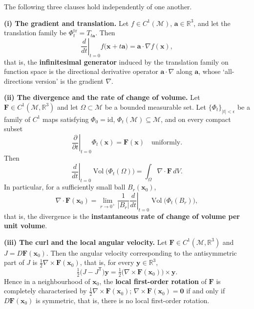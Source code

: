 \begin{theorem}\label{thm:infinitesimal_generators}
The following three clauses hold independently of one another.

\textbf{(i) The gradient and translation.} Let $f \in C^1(\mathcal{M})$, $\mathbf{a} \in \mathbb{R}^3$, and let the translation family be $\Phi_t^{\mathrm{tr}} = T_{t\mathbf a}$. Then
\[
\left.\frac{d}{dt}\right|_{t=0} f\bigl(\mathbf{x} + t\mathbf{a}\bigr) = \mathbf{a}\cdot\nabla f(\mathbf{x}),
\]
that is, the \textbf{infinitesimal generator} induced by the translation family on function space is the directional derivative operator $\mathbf a\cdot\nabla$ along $\mathbf a$, whose `all-directions version' is the gradient $\nabla$.

\textbf{(ii) The divergence and the rate of change of volume.} Let $\mathbf{F} \in C^1(\mathcal{M}, \mathbb{R}^3)$ and let $\Omega \subset \mathcal{M}$ be a bounded measurable set. Let $\{\Phi_t\}_{|t|<\epsilon}$ be a family of $C^1$ maps satisfying $\Phi_0 = \mathrm{id}$, $\Phi_t(\mathcal M)\subseteq\mathcal M$, and on every compact subset
\[
\left.\frac{\partial}{\partial t}\right|_{t=0}\Phi_t(\mathbf{x}) = \mathbf{F}(\mathbf{x}) \quad\text{uniformly}.
\]
Then
\[
\left.\frac{d}{dt}\right|_{t=0}\operatorname{Vol}\bigl(\Phi_t(\Omega)\bigr) = \int_{\Omega} \nabla \cdot \mathbf{F} \, dV .
\]
In particular, for a sufficiently small ball $B_r(\mathbf x_0)$,
\[
\nabla\cdot\mathbf F(\mathbf x_0) = \lim_{r\to0^+}\frac{1}{|B_r|}\left.\frac{d}{dt}\right|_{t=0}\operatorname{Vol}\bigl(\Phi_t(B_r)\bigr),
\]
that is, the divergence is the \textbf{instantaneous rate of change of volume per unit volume}.

\textbf{(iii) The curl and the local angular velocity.} Let $\mathbf{F} \in C^1(\mathcal{M}, \mathbb{R}^3)$ and $J = D\mathbf F(\mathbf x_0)$. Then the angular velocity corresponding to the antisymmetric part of $J$ is $\tfrac12\nabla\times\mathbf F(\mathbf x_0)$, that is, for every $\mathbf{y}\in\mathbb R^3$,
\[
\tfrac{1}{2}\bigl(J - J^{\mathsf T}\bigr)\mathbf{y}
= \tfrac{1}{2}\bigl(\nabla\times\mathbf F(\mathbf x_0)\bigr)\times\mathbf{y}.
\]
Hence in a neighbourhood of $\mathbf x_0$, the \textbf{local first-order rotation} of $\mathbf F$ is completely characterised by $\tfrac12\nabla\times\mathbf F(\mathbf x_0)$; $\nabla\times\mathbf F(\mathbf x_0)=\mathbf 0$ if and only if $D\mathbf F(\mathbf x_0)$ is symmetric, that is, there is no local first-order rotation.
\end{theorem}

